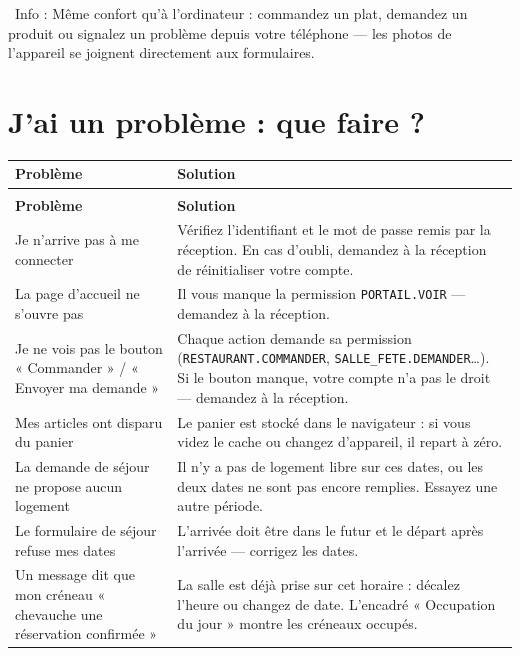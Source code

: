 \documentclass[12pt,a4paper]{article}
\newcommand{\info}[1]{\par\noindent\textcolor{lagoon}{\faInfoCircle\ Info : #1}\par}
\begin{document}
\info{Même confort qu'à l'ordinateur : commandez un plat, demandez un produit ou signalez un problème depuis votre téléphone — les photos de l'appareil se joignent directement aux formulaires.}

\newpage

\section{J'ai un problème : que faire ?}

\begin{longtable}{>{\raggedright}p{5cm} p{9cm}}
\toprule
\textbf{Problème} & \textbf{Solution} \\
\midrule
\endfirsthead
\multicolumn{2}{c}{\textit{Suite de la FAQ}} \\
\toprule
\textbf{Problème} & \textbf{Solution} \\
\midrule
\endhead
\bottomrule
\endfoot

Je n'arrive pas à me connecter & Vérifiez l'identifiant et le mot de passe remis par la réception. En cas d'oubli, demandez à la réception de réinitialiser votre compte. \\

La page d'accueil ne s'ouvre pas & Il vous manque la permission \texttt{PORTAIL.VOIR} — demandez à la réception. \\

Je ne vois pas le bouton « Commander » / « Envoyer ma demande » & Chaque action demande sa permission (\texttt{RESTAURANT.COMMANDER}, \texttt{SALLE\_FETE.DEMANDER}…). Si le bouton manque, votre compte n'a pas le droit — demandez à la réception. \\

Mes articles ont disparu du panier & Le panier est stocké dans le navigateur : si vous videz le cache ou changez d'appareil, il repart à zéro. \\

La demande de séjour ne propose aucun logement & Il n'y a pas de logement libre sur ces dates, ou les deux dates ne sont pas encore remplies. Essayez une autre période. \\

Le formulaire de séjour refuse mes dates & L'arrivée doit être dans le futur et le départ après l'arrivée — corrigez les dates. \\

Un message dit que mon créneau « chevauche une réservation confirmée » & La salle est déjà prise sur cet horaire : décalez l'heure ou changez de date. L'encadré « Occupation du jour » montre les créneaux occupés. \\


\end{longtable}
\end{document}
